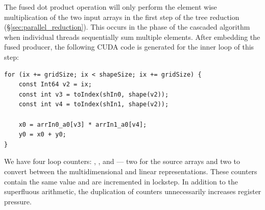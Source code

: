 The fused dot product operation will only perform the element wise
multiplication of the two input arrays in the first step of the tree reduction
(\S\ref{sec:parallel_reduction}). This occurs in the phase of the cascaded
algorithm when individual threads sequentially sum multiple elements. After
embedding the fused producer, the following CUDA code is generated for the inner
loop of this step:
%
%
%
\begin{lstlisting}[style=cuda
    ,firstnumber=18
    ,label=lst:dotp_cuda
    ,caption={Generated CUDA code for the first step of fused dot product}]
for (ix += gridSize; ix < shapeSize; ix += gridSize) {
    const Int64 v2 = ix;
    const int v3 = toIndex(shIn0, shape(v2));
    const int v4 = toIndex(shIn1, shape(v2));

    x0 = arrIn0_a0[v3] * arrIn1_a0[v4];
    y0 = x0 + y0;
}
\end{lstlisting}
%
We have four loop counters: , ,  and  ---
two for the source arrays and two to convert between the multidimensional and
linear representations. These counters contain the same value and are
incremented in lockstep. In addition to the superfluous arithmetic, the
duplication of counters unnecessarily increases register pressure.

